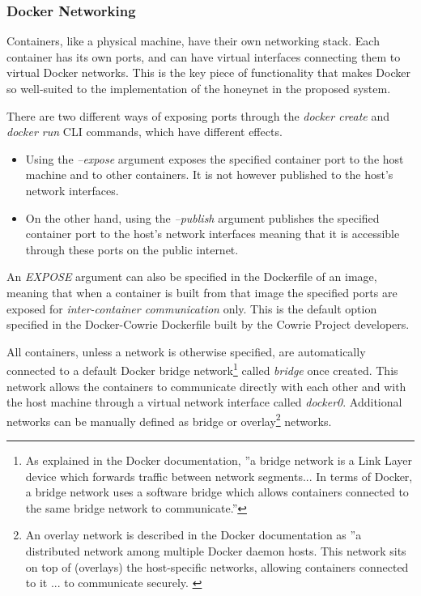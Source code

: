 

\subsubsection{Docker Networking}
    Containers, like a physical machine, have their own networking stack. Each container has its own ports, and can have virtual interfaces connecting them to virtual Docker networks. This is the key piece of functionality that makes Docker so well-suited to the implementation of the honeynet in the proposed system.
    
    There are two different ways of exposing ports through the \textit{docker create} and \textit{docker run} CLI commands, which have different effects. 
\begin{itemize}

\item Using the \textit{--expose} argument exposes the specified container port to the host machine and to other containers. It is not however published to the host's network interfaces.

\item On the other hand, using the \textit{--publish} argument publishes the specified container port to the host's network interfaces meaning that it is accessible through these ports on the public internet.
\end{itemize}

An \textit{EXPOSE} argument can also be specified in the Dockerfile of an image, meaning that when a container is built from that image the specified ports are exposed for \textit{inter-container communication} only.  This is the default option specified in the Docker-Cowrie Dockerfile built by the Cowrie Project developers. \cite{DockerCowrie}

All containers, unless a network is otherwise specified, are automatically connected to a default Docker bridge network\footnote{As explained in the Docker documentation, \cite{UseBridgeNetworksDocker} ''a bridge network is a Link Layer device which forwards traffic between network segments... In terms of Docker, a bridge network uses a software bridge which allows containers connected to the same bridge network to communicate.''} called \textit{bridge} once created. This network allows the containers to communicate directly with each other and with the host machine through a virtual network interface called \textit{docker0}. Additional networks can be manually defined as bridge or overlay\footnote{An overlay network is described in the Docker documentation as ''a distributed network among multiple Docker daemon hosts. This network sits on top of (overlays) the host-specific networks, allowing containers connected to it ... to communicate securely. \cite{UseOverlayNetworksDocker} } networks. 

